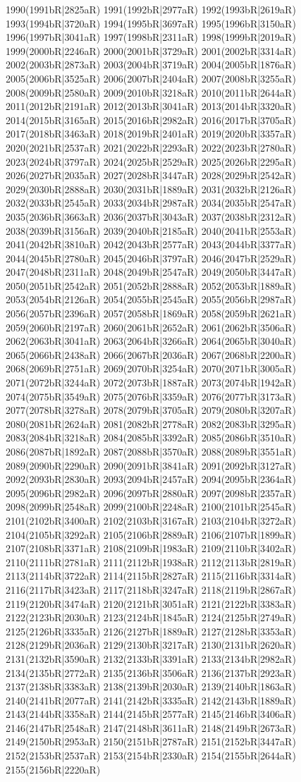 1990(1991bR|2825aR) 1991(1992bR|2977aR) 1992(1993bR|2619aR) 1993(1994bR|3720aR) 1994(1995bR|3697aR) 1995(1996bR|3150aR) 1996(1997bR|3041aR) 1997(1998bR|2311aR) 1998(1999bR|2019aR) 1999(2000bR|2246aR) 2000(2001bR|3729aR) 2001(2002bR|3314aR) 2002(2003bR|2873aR) 2003(2004bR|3719aR) 2004(2005bR|1876aR) 2005(2006bR|3525aR) 2006(2007bR|2404aR) 2007(2008bR|3255aR) 2008(2009bR|2580aR) 2009(2010bR|3218aR) 2010(2011bR|2644aR) 2011(2012bR|2191aR) 2012(2013bR|3041aR) 2013(2014bR|3320aR) 2014(2015bR|3165aR) 2015(2016bR|2982aR) 2016(2017bR|3705aR) 2017(2018bR|3463aR) 2018(2019bR|2401aR) 2019(2020bR|3357aR) 2020(2021bR|2537aR) 2021(2022bR|2293aR) 2022(2023bR|2780aR) 2023(2024bR|3797aR) 2024(2025bR|2529aR) 2025(2026bR|2295aR) 2026(2027bR|2035aR) 2027(2028bR|3447aR) 2028(2029bR|2542aR) 2029(2030bR|2888aR) 2030(2031bR|1889aR) 2031(2032bR|2126aR) 2032(2033bR|2545aR) 2033(2034bR|2987aR) 2034(2035bR|2547aR) 2035(2036bR|3663aR) 2036(2037bR|3043aR) 2037(2038bR|2312aR) 2038(2039bR|3156aR) 2039(2040bR|2185aR) 2040(2041bR|2553aR) 2041(2042bR|3810aR) 2042(2043bR|2577aR) 2043(2044bR|3377aR) 2044(2045bR|2780aR) 2045(2046bR|3797aR) 2046(2047bR|2529aR) 2047(2048bR|2311aR) 2048(2049bR|2547aR) 2049(2050bR|3447aR) 2050(2051bR|2542aR) 2051(2052bR|2888aR) 2052(2053bR|1889aR) 2053(2054bR|2126aR) 2054(2055bR|2545aR) 2055(2056bR|2987aR) 2056(2057bR|2396aR) 2057(2058bR|1869aR) 2058(2059bR|2621aR) 2059(2060bR|2197aR) 2060(2061bR|2652aR) 2061(2062bR|3506aR) 2062(2063bR|3041aR) 2063(2064bR|3266aR) 2064(2065bR|3040aR) 2065(2066bR|2438aR) 2066(2067bR|2036aR) 2067(2068bR|2200aR) 2068(2069bR|2751aR) 2069(2070bR|3254aR) 2070(2071bR|3005aR) 2071(2072bR|3244aR) 2072(2073bR|1887aR) 2073(2074bR|1942aR) 2074(2075bR|3549aR) 2075(2076bR|3359aR) 2076(2077bR|3173aR) 2077(2078bR|3278aR) 2078(2079bR|3705aR) 2079(2080bR|3207aR) 2080(2081bR|2624aR) 2081(2082bR|2778aR) 2082(2083bR|3295aR) 2083(2084bR|3218aR) 2084(2085bR|3392aR) 2085(2086bR|3510aR) 2086(2087bR|1892aR) 2087(2088bR|3570aR) 2088(2089bR|3551aR) 2089(2090bR|2290aR) 2090(2091bR|3841aR) 2091(2092bR|3127aR) 2092(2093bR|2830aR) 2093(2094bR|2457aR) 2094(2095bR|2364aR) 2095(2096bR|2982aR) 2096(2097bR|2880aR) 2097(2098bR|2357aR) 2098(2099bR|2548aR) 2099(2100bR|2248aR) 2100(2101bR|2545aR) 2101(2102bR|3400aR) 2102(2103bR|3167aR) 2103(2104bR|3272aR) 2104(2105bR|3292aR) 2105(2106bR|2889aR) 2106(2107bR|1899aR) 2107(2108bR|3371aR) 2108(2109bR|1983aR) 2109(2110bR|3402aR) 2110(2111bR|2781aR) 2111(2112bR|1938aR) 2112(2113bR|2819aR) 2113(2114bR|3722aR) 2114(2115bR|2827aR) 2115(2116bR|3314aR) 2116(2117bR|3423aR) 2117(2118bR|3247aR) 2118(2119bR|2867aR) 2119(2120bR|3474aR) 2120(2121bR|3051aR) 2121(2122bR|3383aR) 2122(2123bR|2030aR) 2123(2124bR|1845aR) 2124(2125bR|2749aR) 2125(2126bR|3335aR) 2126(2127bR|1889aR) 2127(2128bR|3353aR) 2128(2129bR|2036aR) 2129(2130bR|3217aR) 2130(2131bR|2620aR) 2131(2132bR|3590aR) 2132(2133bR|3391aR) 2133(2134bR|2982aR) 2134(2135bR|2772aR) 2135(2136bR|3506aR) 2136(2137bR|2923aR) 2137(2138bR|3383aR) 2138(2139bR|2030aR) 2139(2140bR|1863aR) 2140(2141bR|2077aR) 2141(2142bR|3335aR) 2142(2143bR|1889aR) 2143(2144bR|3358aR) 2144(2145bR|2577aR) 2145(2146bR|3406aR) 2146(2147bR|2548aR) 2147(2148bR|3611aR) 2148(2149bR|2673aR) 2149(2150bR|2953aR) 2150(2151bR|2787aR) 2151(2152bR|3447aR) 2152(2153bR|2537aR) 2153(2154bR|2330aR) 2154(2155bR|2644aR) 2155(2156bR|2220aR) 